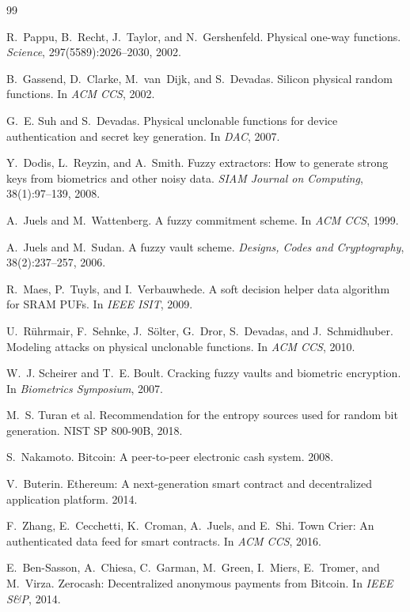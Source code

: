 \documentclass[10pt,twocolumn]{article}
\theoremstyle{remark}
\begin{document}
\begin{thebibliography}{99}
\small
\setlength{\itemsep}{1pt}

 R.~Pappu, B.~Recht, J.~Taylor, and N.~Gershenfeld.
Physical one-way functions. \emph{Science}, 297(5589):2026--2030, 2002.

 B.~Gassend, D.~Clarke, M.~van~Dijk, and S.~Devadas.
Silicon physical random functions. In \emph{ACM CCS}, 2002.

 G.~E. Suh and S.~Devadas. Physical unclonable functions for
device authentication and secret key generation. In \emph{DAC}, 2007.

 Y.~Dodis, L.~Reyzin, and A.~Smith. Fuzzy extractors: How to
generate strong keys from biometrics and other noisy data. \emph{SIAM Journal on
Computing}, 38(1):97--139, 2008.

 A.~Juels and M.~Wattenberg. A fuzzy commitment scheme. In
\emph{ACM CCS}, 1999.

 A.~Juels and M.~Sudan. A fuzzy vault scheme.
\emph{Designs, Codes and Cryptography}, 38(2):237--257, 2006.

 R.~Maes, P.~Tuyls, and I.~Verbauwhede. A soft decision helper
data algorithm for SRAM PUFs. In \emph{IEEE ISIT}, 2009.

 U.~R\"uhrmair, F.~Sehnke, J.~S\"olter, G.~Dror,
S.~Devadas, and J.~Schmidhuber. Modeling attacks on physical unclonable
functions. In \emph{ACM CCS}, 2010.

 W.~J. Scheirer and T.~E. Boult. Cracking fuzzy vaults and
biometric encryption. In \emph{Biometrics Symposium}, 2007.

 M.~S. Turan et al. Recommendation for the entropy sources used
for random bit generation. NIST SP 800-90B, 2018.

 S.~Nakamoto. Bitcoin: A peer-to-peer electronic cash
system. 2008.

 V.~Buterin. Ethereum: A next-generation smart contract and
decentralized application platform. 2014.

 F.~Zhang, E.~Cecchetti, K.~Croman, A.~Juels, and E.~Shi.
Town Crier: An authenticated data feed for smart contracts. In \emph{ACM CCS},
2016.

 E.~Ben-Sasson, A.~Chiesa, C.~Garman, M.~Green, I.~Miers,
E.~Tromer, and M.~Virza. Zerocash: Decentralized anonymous payments from
Bitcoin. In \emph{IEEE S\&P}, 2014.


\end{thebibliography}
\end{document}
